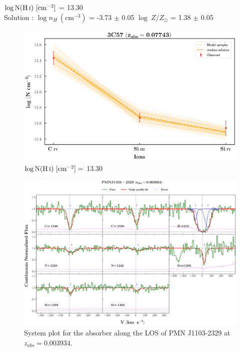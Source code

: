   
  $\log \text{N}(\ion{H}{i}) \ [\text{cm}^{-2}]$ = 13.30   \\ 
  
  Solution : $\log n_H \ (\text{cm}^{-3})$ = -3.73 $\pm$ 0.05 \hspace{10mm} $\log \ Z/Z_\odot$ = 1.38 $\pm$ 0.05 \\
  
  \begin{figure}[!h]
      \centering
      \includegraphics[width=0.9\linewidth]{Ionisation-Modelling-Plots/3c57-z=0.07743-compI_logZ=-1.png}
      \caption{$\log \text{N}(\ion{H}{i}) \ [\text{cm}^{-2}]=$ 13.30}
  \end{figure}
  
  
  \newpage
  
  \begin{landscape}
  
  \begin{figure}
      \centering
      \vspace{-20mm}
      \hspace*{-35mm}
      \includegraphics[width=1.25\linewidth]{System-Plots/PMNJ1103-2329_z=0.003934_sys_plot.png}
      \caption{System plot for the absorber along the LOS of PMN J1103-2329 at $z_{abs} = 0.003934$. }
  \end{figure}
  
  \end{landscape}
  

